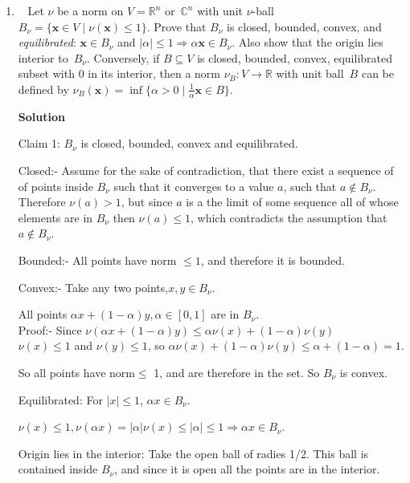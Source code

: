 \documentclass[11pt]{article}
\newcommand\score[1]{\marginpar{\vspace{-2ex}\color{blue}{#1/3}}\hspace{-1ex}}
\newcommand\0{\mathbf{0}}
\newcommand\CC{\mathbb{C}}
\newcommand\RR{\mathbb{R}}
\newcommand\xx{\mathbf{x}}
\newcommand\<{\langle}
\renewcommand\>{\rangle}
\renewcommand\implies{\Rightarrow}
\begin{document}
\begin{enumerate}
3. $\mu \circ \varphi (x+y)$ $ \leq$ $\mu \circ \varphi (x) + \mu \circ \varphi(y)$
Since $\mu$ is a norm $\mu (x+y) \leq \mu(x) + \mu(y)$. So 
$\mu \circ \varphi (x+y) = \mu (\varphi(x) + \varphi(y)) \leq \mu \circ \varphi(x) + \mu \circ \varphi (y)$.

So $\mu \circ \varphi$ is a norm on $W$.


\pagebreak
\item\ \score{}%
Let $\nu$ be a norm on $V = \RR^n$ or~$\CC^n$ with unit $\nu$-ball
$B_\nu = \{\xx \in V \mid \nu(\xx) \leq 1\}$.  Prove that $B_\nu$ is
closed, bounded, convex, and \emph{equilibrated}: $\xx \in B_\nu$ and
$|\alpha| \leq 1 \implies \alpha\xx \in B_\nu$.  Also show that the
origin lies interior to~$B_\nu$.  Conversely, if $B \subseteq V$ is
closed, bounded, convex, equilibrated subset with $0$ in its interior,
then a norm $\nu_B: V \to \RR$ with unit ball~$B$ can be defined by
$\nu_B(\xx) = \inf\{\alpha > 0 \mid \frac 1\alpha \xx \in B\}$.

\textbf{Solution}


Claim 1: $B_\nu$ is closed, bounded, convex and equilibrated.

Closed:- Assume for the sake of contradiction, that there exist a sequence of
of points inside $B_\nu$ such that it converges to a value $a$, such that $a \notin B_\nu$.
Therefore $\nu(a) > 1$, but since $a$ is a the limit of some sequence
all of whose elements are in $B_\nu$ then $\nu(a) \leq 1$, which contradicts the 
assumption that $a \notin B_\nu$.

Bounded:- All points have norm $\leq 1$, and therefore it is bounded.

Convex:- Take any two points,$x,y \in B_\nu$.

All points $\alpha x + (1-\alpha) y, \alpha \in [0,1]$ are in $B_\nu$.
\\
Proof:- Since $\nu(\alpha x + (1-\alpha) y) \leq \alpha \nu(x) + (1-\alpha)\nu(y)$\\

$\nu(x) \leq 1$ and $\nu(y) \leq 1$, so $\alpha \nu(x) + (1-\alpha)\nu(y) \leq \alpha + (1-\alpha) = 1$.

So all points have norm$\leq$ 1, and are therefore in the set. So $B_\nu$ is convex.

Equilibrated: For $|x| \leq 1$, $\alpha x \in B_\nu$.

$\nu(x) \leq 1, \nu(\alpha x)= |\alpha|\nu(x) \leq |\alpha| \leq 1 \Rightarrow \alpha x \in B_\nu$.

Origin lies in the interior: Take the open ball of radies 1/2. This ball is contained inside $B_\nu$, and since 
it is open all the points are in the interior.


\end{enumerate}
\end{document}
